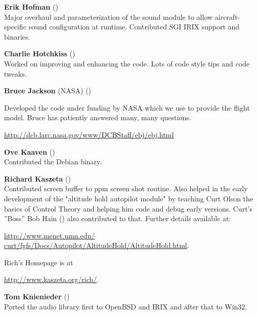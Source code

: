 \noindent \textbf{Erik Hofman} ()\\
  Major overhaul and parameterization of the sound module to allow
  aircraft-specific sound configuration at runtime.
  Contributed SGI IRIX support and binaries.
 \medskip

\noindent \textbf{Charlie Hotchkiss}
()\\ Worked on improving and enhancing the  code.
Lots of code style tips and code tweaks.
 \medskip

\noindent \textbf{Bruce Jackson} (NASA)
()
 \medskip

   Developed the  code under funding by NASA which we use to provide the
   flight model. Bruce has patiently answered many, many questions.
 \medskip

  \href{http://dcb.larc.nasa.gov/www/DCBStaff/ebj/ebj.html}{http://dcb.larc.nasa.gov/www/DCBStaff/ebj/ebj.html}
  \medskip


\noindent \textbf{Ove Kaaven}  ()\\
 Contributed the Debian binary.
 \medskip

\noindent \textbf{Richard Kaszeta}  ()\\
  Contributed screen buffer to ppm screen shot routine.
  Also helped in the early development of the "altitude
  hold autopilot module" by teaching Curt Olson the basics of Control Theory
  and helping him code and debug early versions. Curt's ''Boss'' Bob Hain
 () also contributed to that.  Further details available at:
 \medskip

  \href{http://www.menet.umn.edu/~curt/fgfs/Docs/Autopilot/AltitudeHold/AltitudeHold.html}{http://www.menet.umn.edu/$\tilde{~~}$curt/fgfs/Docs/Autopilot/AltitudeHold/AltitudeHold.html}.
  \medskip

\noindent
  Rich's Homepage is at
  \medskip

  \href{http://www.kaszeta.org/rich/}{http://www.kaszeta.org/rich/}.
  \medskip

\noindent \textbf{Tom Knienieder} ()\\
  Ported the audio library first to OpenBSD and IRIX and after that to Win32.
 \medskip

